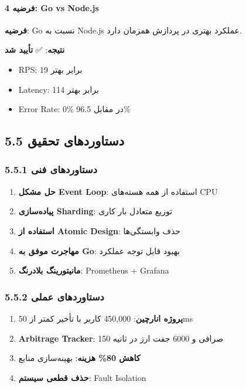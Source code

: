 \documentclass[
]{article}
\providecommand{\tightlist}{%
  \setlength{\itemsep}{0pt}\setlength{\parskip}{0pt}}
\begin{document}
\paragraph{فرضیه 4: Go vs
Node.js}\label{ux641ux631ux636ux6ccux647-4-go-vs-node.js}

\textbf{فرضیه}: Go نسبت به Node.js عملکرد بهتری در پردازش همزمان دارد.

\textbf{نتیجه}: ✅ \textbf{تأیید شد}

\begin{itemize}
\tightlist
\item
  RPS: 19 برابر بهتر
\item
  Latency: 114 برابر بهتر
\item
  Error Rate: 0\% در مقابل 96.5\%
\end{itemize}

\subsection{5.5 دستاوردهای
تحقیق}\label{ux62fux633ux62aux627ux648ux631ux62fux647ux627ux6cc-ux62aux62dux642ux6ccux642}

\subsubsection{5.5.1 دستاوردهای
فنی}\label{ux62fux633ux62aux627ux648ux631ux62fux647ux627ux6cc-ux641ux646ux6cc}

\begin{enumerate}
\def\labelenumi{\arabic{enumi}.}
\tightlist
\item
  \textbf{حل مشکل Event Loop}: استفاده از همه هسته‌های CPU
\item
  \textbf{پیاده‌سازی Sharding}: توزیع متعادل بار کاری
\item
  \textbf{استفاده از Atomic Design}: حذف وابستگی‌ها
\item
  \textbf{مهاجرت موفق به Go}: بهبود قابل توجه عملکرد
\item
  \textbf{مانیتورینگ بلادرنگ}: Prometheus + Grafana
\end{enumerate}

\subsubsection{5.5.2 دستاوردهای
عملی}\label{ux62fux633ux62aux627ux648ux631ux62fux647ux627ux6cc-ux639ux645ux644ux6cc}

\begin{enumerate}
\def\labelenumi{\arabic{enumi}.}
\tightlist
\item
  \textbf{پروژه انارچین}: 450,000 کاربر با تأخیر کمتر از 50ms
\item
  \textbf{Arbitrage Tracker}: 150 صرافی و 6000 جفت ارز در ثانیه
\item
  \textbf{کاهش 80\% هزینه}: بهینه‌سازی منابع
\item
  \textbf{حذف قطعی سیستم}: Fault Isolation
\end{enumerate}
\end{document}
